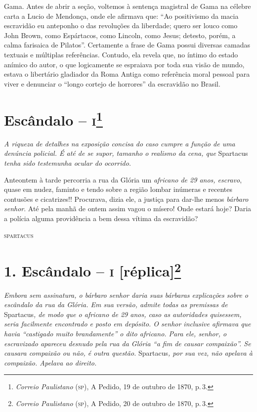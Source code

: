 \begin{argumento}
{Gama. Antes de abrir a seção, voltemos à sentença magistral de Gama na
célebre carta a Lucio de Mendonça, onde ele afirmava que: ``Ao
positivismo da macia escravidão eu anteponho o das revoluções da
liberdade; quero ser louco como John Brown, como Espártacos, como
Lincoln, como Jesus; detesto, porém, a calma farisaica de Pilatos''.
Certamente a frase de Gama possui diversas camadas textuais e múltiplas
referências. Contudo, ela revela que, no íntimo do estado anímico do
autor, o que logicamente se espraiava por toda sua visão de mundo,
estava o libertário gladiador da Roma Antiga como referência moral
pessoal para viver e denunciar o ``longo cortejo de horrores'' da
escravidão no Brasil.}
\end{argumento}

\chapter{Escândalo -- \textsc{i}\footnote{\emph{Correio Paulistano} (\textsc{sp}), A Pedido, 19 de outubro de 1870,
  p.\,3.}} %

\begin{didascalia}
\emph{A riqueza de detalhes na exposição concisa do caso cumpre a função
de uma denúncia policial. É até de se supor, tamanho o realismo da cena,
que} Spartacus \emph{tenha sido testemunha ocular do ocorrido.}
\end{didascalia}

Anteontem à tarde percorria a rua da Glória um \emph{africano de 29
anos, escravo}, quase em nudez, faminto e tendo sobre a região lombar
inúmeras e recentes contusões e cicatrizes!! Procurava, dizia ele, a
justiça para dar-lhe menos \emph{bárbaro senhor}. Até pela manhã de
ontem assim vagou o mísero! Onde estará hoje? Daria a polícia alguma
providência a bem dessa vítima da escravidão?

\begin{flushright}
\textsc{spartacus}
\end{flushright}

\chapter{1. Escândalo -- \textsc{i} {[}réplica{]}\footnote{\emph{Correio Paulistano} (\textsc{sp}), A Pedido, 20 de outubro de 1870,
  p.\,3.}} %

\begin{didascalia}
\emph{Embora sem assinatura, o bárbaro senhor daria suas bárbaras
explicações sobre o escândalo da rua da Glória. Em sua versão, admite
todas as premissas de} Spartacus\emph{, de modo que o africano de 29
anos, caso as autoridades quisessem, seria facilmente encontrado e posto
em depósito. O senhor inclusive afirmava que havia ``castigado muito
brandamente'' o dito africano. Para ele, senhor, o escravizado apareceu
desnudo pela rua da Glória ``a fim de causar compaixão''. Se causara
compaixão ou não, é outra questão.} Spartacus\emph{, por sua vez, não
apelava à compaixão. Apelava ao direito.}
\end{didascalia}


